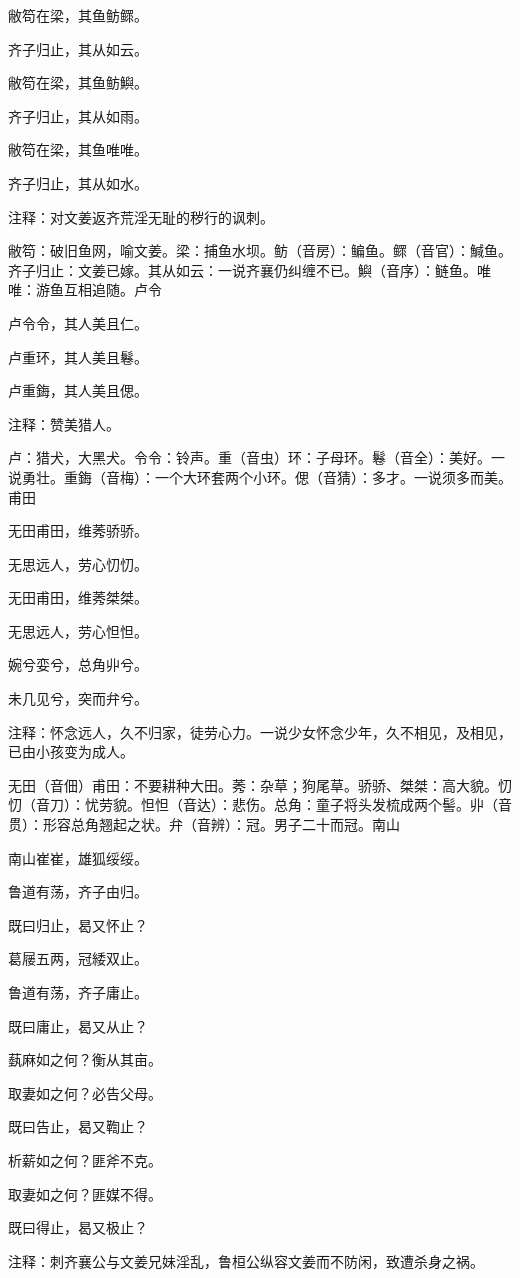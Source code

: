 \documentclass[12pt,UTF8]{ctexbook}
\begin{document}
敝笱在梁，其鱼鲂鳏。

齐子归止，其从如云。

敝笱在梁，其鱼鲂鱮。

齐子归止，其从如雨。

敝笱在梁，其鱼唯唯。

齐子归止，其从如水。

注释：对文姜返齐荒淫无耻的秽行的讽刺。

敝笱：破旧鱼网，喻文姜。梁：捕鱼水坝。鲂（音房）：鳊鱼。鳏（音官）：鰔鱼。齐子归止：文姜已嫁。其从如云：一说齐襄仍纠缠不已。鱮（音序）：鲢鱼。唯唯：游鱼互相追随。卢令

卢令令，其人美且仁。

卢重环，其人美且鬈。

卢重鋂，其人美且偲。

注释：赞美猎人。

卢：猎犬，大黑犬。令令：铃声。重（音虫）环：子母环。鬈（音全）：美好。一说勇壮。重鋂（音梅）：一个大环套两个小环。偲（音猜）：多才。一说须多而美。 甫田

无田甫田，维莠骄骄。

无思远人，劳心忉忉。

无田甫田，维莠桀桀。

无思远人，劳心怛怛。

婉兮娈兮，总角丱兮。

未几见兮，突而弁兮。

注释：怀念远人，久不归家，徒劳心力。一说少女怀念少年，久不相见，及相见，已由小孩变为成人。

无田（音佃）甫田：不要耕种大田。莠：杂草；狗尾草。骄骄、桀桀：高大貌。忉忉（音刀）：忧劳貌。怛怛（音达）：悲伤。总角：童子将头发梳成两个髻。丱（音贯）：形容总角翘起之状。弁（音辨）：冠。男子二十而冠。南山

南山崔崔，雄狐绥绥。

鲁道有荡，齐子由归。

既曰归止，曷又怀止？

葛屦五两，冠緌双止。

鲁道有荡，齐子庸止。

既曰庸止，曷又从止？

蓺麻如之何？衡从其亩。

取妻如之何？必告父母。

既曰告止，曷又鞫止？

析薪如之何？匪斧不克。

取妻如之何？匪媒不得。

既曰得止，曷又极止？

注释：刺齐襄公与文姜兄妹淫乱，鲁桓公纵容文姜而不防闲，致遭杀身之祸。
\end{document}
